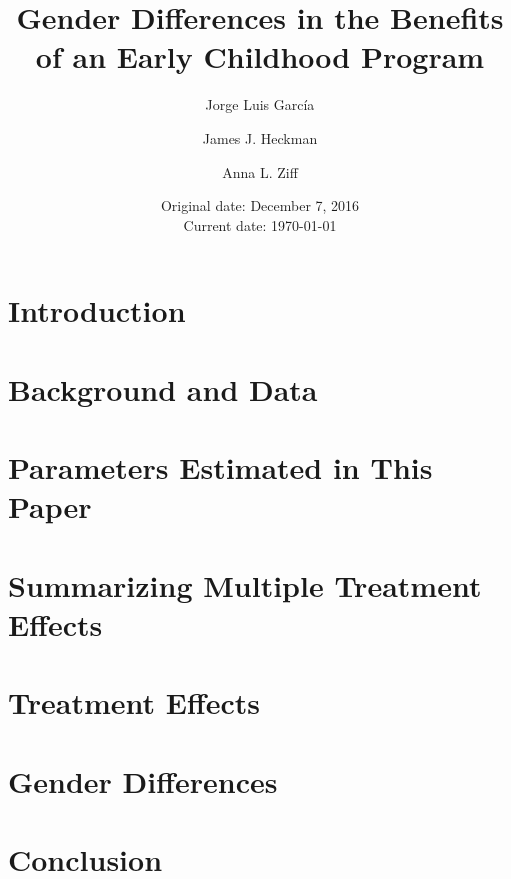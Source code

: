 








\title{Gender Differences in the Benefits of an Early Childhood Program}
\author{Jorge Luis Garc\'{i}a \and James J. Heckman \and Anna L. Ziff}
\date{Original date: December 7, 2016 \\ Current date: \today}
\maketitle


\tableofcontents

\doublespacing

\section{Introduction}
\label{sec:introduction}
	

\section{Background and Data}
\label{sec:data}


\section{Parameters Estimated in This Paper} 
\label{sec:parameters}


\section{Summarizing Multiple Treatment Effects}
\label{sec:combining-functions}


\section{Treatment Effects}
\label{sec:treatment-effects}


\section{Gender Differences}
\label{sec:gender-differences}


\section{Conclusion}
\label{sec:conclusion}


\clearpage
\singlespacing




